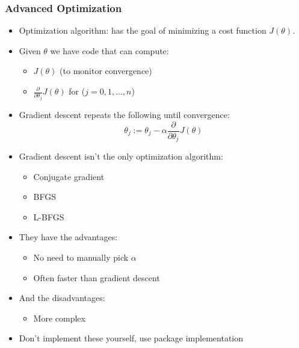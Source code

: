 \subsubsection{Advanced Optimization}
\begin{itemize}[--]
	\item Optimization algorithm: has the goal of minimizing a cost function $J(\theta)$. 
	\item Given $\theta$ we have code that can compute:
	\begin{itemize}[--]
		\item $J(\theta)$ (to monitor convergence)
		\item $\frac{\partial}{\partial\theta_j}J(\theta)$ for ($j=0,1,\ldots, n$)
	\end{itemize}

	\item Gradient descent repeats the following until convergence:
	$$\theta_j := \theta_j - \alpha\frac{\partial}{\partial\theta_j}J(\theta)$$

	\item Gradient descent isn't the only optimization algorithm:
	\begin{itemize}[--]
		\item Conjugate gradient
		\item BFGS
		\item L-BFGS
	\end{itemize}

	\item They have the advantages:
	\begin{itemize}[--]
		\item No need to manually pick $\alpha$
		\item Often faster than gradient descent
	\end{itemize}

	\item And the disadvantages:
	\begin{itemize}[--]
		\item More complex
	\end{itemize}

	\item Don't implement these yourself, use package implementation
\end{itemize}

